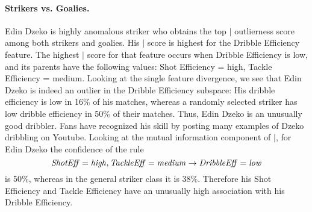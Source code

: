 {							\paragraph{Strikers vs. Goalies.} 
							Edin Dzeko is  highly anomalous striker who obtains 
							the top $\mid$ outlierness score among both strikers and goalies. His $\mid$ score is highest for the Dribble Efficiency feature. The highest $\mid$ score for that feature occurs when Dribble Efficiency is low, and its parents have the following values: Shot Efficiency = high, Tackle Efficiency = medium. Looking at the single feature divergence, 
							we see that Edin Dzeko is indeed an outlier in the Dribble Efficiency subspace: His dribble efficiency is low in 16\% of his matches, whereas a randomly selected striker has low dribble efficiency in 50\% of their matches. Thus, Edin Dzeko is an unusually good dribbler. Fans have recognized his skill by posting many examples of Dzeko dribbling on Youtube. Looking at the mutual information component of $\mid$, for Edin Dzeko the confidence of the rule 
							$$\it{ShotEff} = \it{high}, \it{TackleEff} = \it{medium}\rightarrow \it{DribbleEff} = \it{low}$$ is 50\%, whereas in the general striker class it is $38\%$. Therefore his Shot Efficiency and Tackle Efficiency have an unusually high association with his Dribble Efficiency.
							
}
